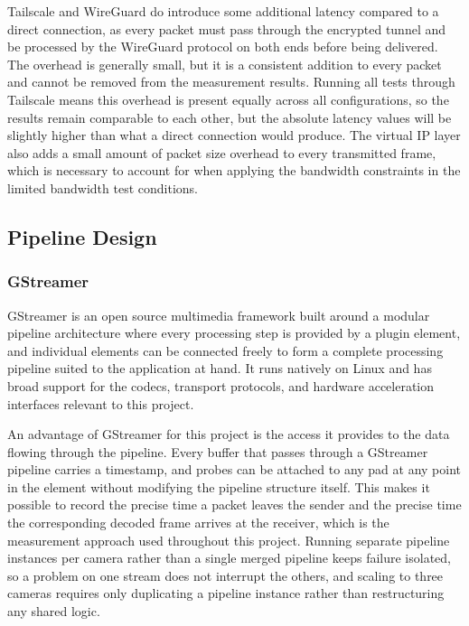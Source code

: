 Tailscale and WireGuard do introduce some additional latency compared to a direct connection, as every packet must pass through the encrypted tunnel and be processed by the WireGuard protocol on both ends before being delivered. The overhead is generally small, but it is a consistent addition to every packet and cannot be removed from the measurement results. Running all tests through Tailscale means this overhead is present equally across all configurations, so the results remain comparable to each other, but the absolute latency values will be slightly higher than what a direct connection would produce. The virtual IP layer also adds a small amount of packet size overhead to every transmitted frame, which is necessary to account for when applying the bandwidth constraints in the limited bandwidth test conditions.

\subsection{Pipeline Design}

\subsubsection{GStreamer}

GStreamer is an open source multimedia framework built around a modular pipeline architecture where every processing step is provided by a plugin element, and individual elements can be connected freely to form a complete processing pipeline suited to the application at hand. It runs natively on Linux and has broad support for the codecs, transport protocols, and hardware acceleration interfaces relevant to this project.

An advantage of GStreamer for this project is the access it provides to the data flowing through the pipeline. Every buffer that passes through a GStreamer pipeline carries a timestamp, and probes can be attached to any pad at any point in the element without modifying the pipeline structure itself. This makes it possible to record the precise time a packet leaves the sender and the precise time the corresponding decoded frame arrives at the receiver, which is the measurement approach used throughout this project. Running separate pipeline instances per camera rather than a single merged pipeline keeps failure isolated, so a problem on one stream does not interrupt the others, and scaling to three cameras requires only duplicating a pipeline instance rather than restructuring any shared logic.

